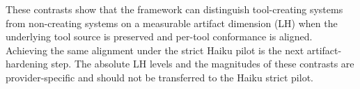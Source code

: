 \documentclass[sigconf,anonymous,review,natbib=false]{acmart}
\begin{document}
These contrasts show that the framework can distinguish
tool-creating systems from non-creating systems on a measurable
artifact dimension (LH) when the underlying tool source is preserved
and per-tool conformance is aligned. Achieving the same alignment
under the strict Haiku pilot is the next artifact-hardening step. The
absolute LH levels and the magnitudes of these contrasts are
provider-specific and should not be transferred to the Haiku strict
pilot.


\end{document}
